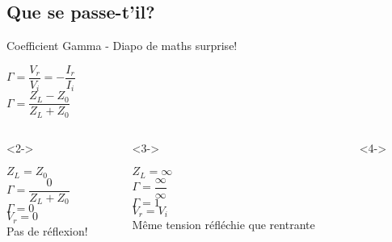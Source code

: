 \subsection{Que se passe-t'il?}
\begin{frame}{Coefficient Gamma - Diapo de maths surprise!}
    \begin{center}
        $\Gamma = \dfrac{V_r}{V_i} = -\dfrac{I_r}{I_i}$\\
        \vspace{10pt}
        $\Gamma = \dfrac{Z_L - Z_0}{Z_L + Z_0}$\\
    \end{center}
    \vspace{3.33mm}
    \begin{columns}
        \begin{column}{0.33\textwidth}<2->
            \begin{center}
                $Z_L = Z_0$\\
                \vspace{10pt}
                $\Gamma = \dfrac{0}{Z_L + Z_0}$\\
                \vspace{10pt}
                $\Gamma = 0$\\
                \vspace{5pt}
                $V_r = 0$\\
                \vspace{5pt}
                Pas de réflexion!
            \end{center}
        \end{column}
        \begin{column}{0.33\textwidth}<3->
            \begin{center}
                $Z_L = \infty$\\
                \vspace{10pt}
                $\Gamma = \dfrac{\infty}{\infty}$\\
                \vspace{10pt}
                $\Gamma = 1$\\
                \vspace{5pt}
                $V_r = V_i$\\
                \vspace{5pt}
                Même tension réfléchie que rentrante
            \end{center}
        \end{column}
        \begin{column}{0.33\textwidth}<4->

\end{column}
\end{columns}
\end{frame}
